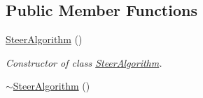 \subsection*{Public Member Functions}
\begin{DoxyCompactItemize}
\item 
\hyperlink{class_steer_algorithm_af64dd94816ab9d00d85227a42b26a3e8}{Steer\+Algorithm} ()\hypertarget{class_steer_algorithm_af64dd94816ab9d00d85227a42b26a3e8}{}\label{class_steer_algorithm_af64dd94816ab9d00d85227a42b26a3e8}

\begin{DoxyCompactList}\small\item\em Constructor of class \hyperlink{class_steer_algorithm}{Steer\+Algorithm}. \end{DoxyCompactList}\item 
\hyperlink{class_steer_algorithm_a37dd2ef0ed856582aaacc103a6cd6700}{$\sim$\+Steer\+Algorithm} ()\hypertarget{class_steer_algorithm_a37dd2ef0ed856582aaacc103a6cd6700}{}\label{class_steer_algorithm_a37dd2ef0ed856582aaacc103a6cd6700}


\end{DoxyCompactItemize}
